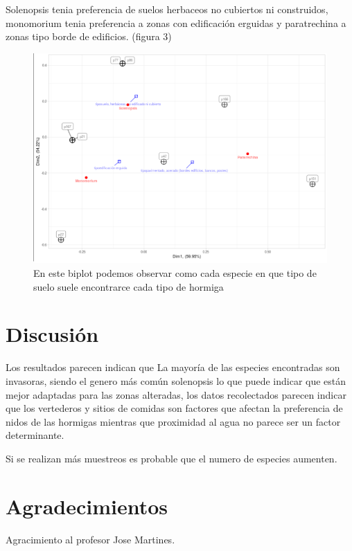 \documentclass[11pt,]{article}
\begin{document}
Solenopsis tenia preferencia de suelos herbaceos no cubiertos ni
construidos, monomorium tenia preferencia a zonas con edificación
erguidas y paratrechina a zonas tipo borde de edificios. (figura 3)

\begin{figure}
\centering
\includegraphics{img/preferencias de hormigas.png}
\caption{En este biplot podemos observar como cada especie en que tipo
de suelo suele encontrarce cada tipo de hormiga}
\end{figure}

\section{Discusión}\label{discusiuxf3n}

Los resultados parecen indican que La mayoría de las especies
encontradas son invasoras, siendo el genero más común solenopsis lo que
puede indicar que están mejor adaptadas para las zonas alteradas, los
datos recolectados parecen indicar que los vertederos y sitios de
comidas son factores que afectan la preferencia de nidos de las hormigas
mientras que proximidad al agua no parece ser un factor determinante.

Si se realizan más muestreos es probable que el numero de especies
aumenten.

\section{Agradecimientos}\label{agradecimientos}

Agracimiento al profesor Jose Martines.
\end{document}
